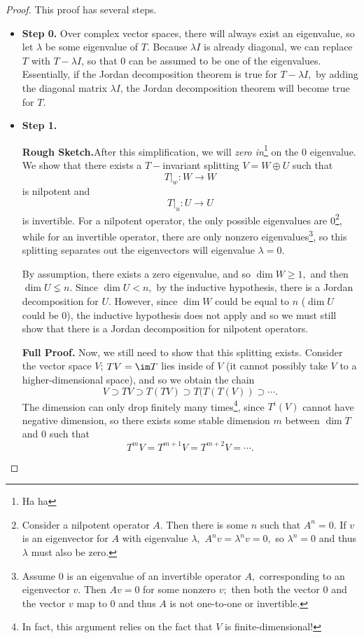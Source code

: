 \begin{proof}
This proof has several steps.

\begin{itemize}
    \item \textbf{Step 0.} Over complex vector spaces, there will always exist an eigenvalue, so let $\lambda$ be some eigenvalue of $T.$ Because $\lambda I$ is already diagonal, we can replace $T$ with $T - \lambda I$, so that 0 can be assumed to be one of the eigenvalues. Essentially, if the Jordan decomposition theorem is true for $T - \lambda I,$ by adding the diagonal matrix $\lambda I$, the Jordan decomposition theorem will become true for $T.$
    
    \item \textbf{Step 1.} 
    
    \textbf{Rough Sketch.}After this simplification, we will \emph{zero in}\footnote{Ha ha} on the 0 eigenvalue. We show that there exists a $T-$invariant splitting $V = W \oplus U$ such that \[T \big|_w: W \rightarrow W\] is nilpotent and 
    \[T \big|_u: U \rightarrow U\] is invertible. For a nilpotent operator, the only possible eigenvalues are 0\footnote{Consider a nilpotent operator $A.$ Then there is some $n$ such that $A^n = 0.$ If $v$ is an eigenvector for $A$ with eigenvalue $\lambda,$ $A^n v = \lambda^n v = 0,$ so $\lambda^n = 0$ and thus $\lambda$ must also be zero.}, while for an invertible operator, there are only nonzero eigenvalues\footnote{Assume 0 is an eigenvalue of an invertible operator $A,$ corresponding to an eigenvector $v.$ Then $Av = 0$ for some nonzero $v;$ then both the vector 0 and the vector $v$ map to 0 and thus $A$ is not one-to-one or invertible.}, so this splitting separates out the eigenvectors will eigenvalue $\lambda = 0.$
    
    By assumption, there exists a zero eigenvalue, and so $\dim W \geq 1,$ and then $\dim U \lneq n.$ Since $\dim U < n,$ by the inductive hypothesis, there is a Jordan decomposition for $U.$ However, since $\dim W$ could be equal to $n$ ($\dim U$ could be 0), the inductive hypothesis does not apply and so we must still show that there is a Jordan decomposition for nilpotent operators.
    
    \textbf{Full Proof.} Now, we still need to show that this splitting exists. Consider the vector space $V$; $TV = \im T$ lies inside of $V$ (it cannot possibly take $V$ to a higher-dimensional space), and so we obtain the chain \[V \supset TV \supset T(TV) \supset T(T(T(V)) \supset \cdots .\] The dimension can only drop finitely many times\footnote{In fact, this argument relies on the fact that $V$ is finite-dimensional!}, since $T^i(V)$ cannot have negative dimension, so there exists some stable dimension $m$ between $\dim T$ and $0$ such that \[
    T^m V = T^{m + 1}V = T^{m + 2}V = \cdots.
    \]
    

\end{itemize}
\end{proof}
